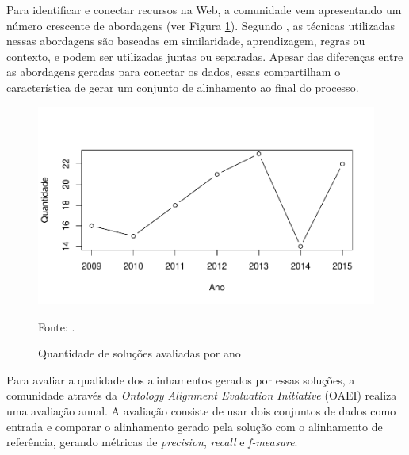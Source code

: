 Para identificar e conectar recursos na Web, a comunidade vem apresentando um número crescente de abordagens (ver Figura \ref{fig:oaei_imtools}). Segundo , as técnicas utilizadas nessas abordagens são baseadas em similaridade, aprendizagem, regras ou contexto, e podem ser utilizadas juntas ou separadas. Apesar das diferenças entre as abordagens geradas para conectar os dados, essas compartilham o característica de gerar um conjunto de alinhamento ao final do processo.

\begin{figure}[!ht]
	\centering
	\includegraphics[width=1\textwidth]{./imagens/im_tools.pdf}
    \caption{Quantidade de soluções avaliadas por ano}
	\footnotesize{Fonte: \cite{cheatham2015results}.}
	\label{fig:oaei_imtools}
\end{figure}

Para avaliar a qualidade dos alinhamentos gerados por essas soluções, a comunidade através da \textit{Ontology Alignment Evaluation Initiative} (OAEI) realiza uma avaliação anual. A avaliação consiste de usar dois conjuntos de dados como entrada e comparar o alinhamento gerado pela solução com o alinhamento de referência, gerando métricas de \textit{precision}, \textit{recall} e \textit{f-measure}.



